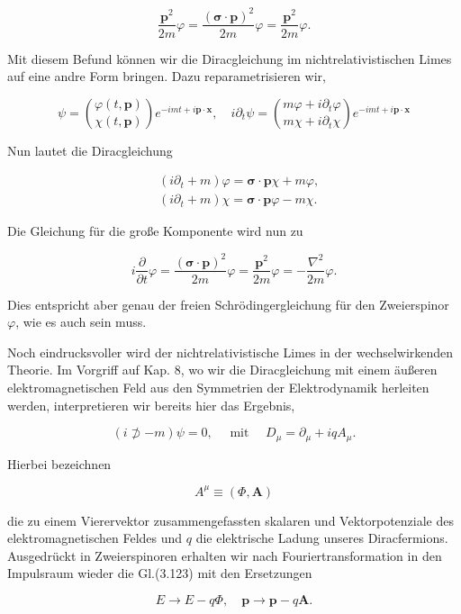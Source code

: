 \documentclass[10pt, letterpaper]{article}
\begin{document}
$$
\frac{\mathbf{p}^{2}}{2 m} \varphi=\frac{(\boldsymbol{\sigma} \cdot \mathbf{p})^{2}}{2 m} \varphi=\frac{\mathbf{p}^{2}}{2 m} \varphi .
$$

Mit diesem Befund können wir die Diracgleichung im nichtrelativistischen Limes auf eine andre Form bringen. Dazu reparametrisieren wir,

$$
\psi=\binom{\varphi(t, \mathbf{p})}{\chi(t, \mathbf{p})} e^{-i m t+i \mathbf{p} \cdot \mathbf{x}}, \quad i \partial_{t} \psi=\binom{m \varphi+i \partial_{t} \varphi}{m \chi+i \partial_{t} \chi} e^{-i m t+i \mathbf{p} \cdot \mathbf{x}}
$$

Nun lautet die Diracgleichung

$$
\begin{aligned}
& \left(i \partial_{t}+m\right) \varphi=\boldsymbol{\sigma} \cdot \mathbf{p} \chi+m \varphi, \\
& \left(i \partial_{t}+m\right) \chi=\boldsymbol{\sigma} \cdot \mathbf{p} \varphi-m \chi .
\end{aligned}
$$

Die Gleichung für die große Komponente wird nun zu

$$
i \frac{\partial}{\partial t} \varphi=\frac{(\boldsymbol{\sigma} \cdot \mathbf{p})^{2}}{2 m} \varphi=\frac{\mathbf{p}^{2}}{2 m} \varphi=-\frac{\nabla^{2}}{2 m} \varphi .
$$

Dies entspricht aber genau der freien Schrödingergleichung für den Zweierspinor $\varphi$, wie es auch sein muss.

Noch eindrucksvoller wird der nichtrelativistische Limes in der wechselwirkenden Theorie. Im Vorgriff auf Kap. 8, wo wir die Diracgleichung mit einem äußeren elektromagnetischen Feld aus den Symmetrien der Elektrodynamik herleiten werden, interpretieren wir bereits hier das Ergebnis,

$$
(i \not \supset-m) \psi=0, \quad \text { mit } \quad D_{\mu}=\partial_{\mu}+i q A_{\mu} .
$$

Hierbei bezeichnen

$$
A^{\mu} \equiv(\Phi, \mathbf{A})
$$

die zu einem Vierervektor zusammengefassten skalaren und Vektorpotenziale des elektromagnetischen Feldes und $q$ die elektrische Ladung unseres Diracfermions. Ausgedrückt in Zweierspinoren erhalten wir nach Fouriertransformation in den Impulsraum wieder die Gl.(3.123) mit den Ersetzungen

$$
E \rightarrow E-q \Phi, \quad \mathbf{p} \rightarrow \mathbf{p}-q \mathbf{A} .
$$
\end{document}
